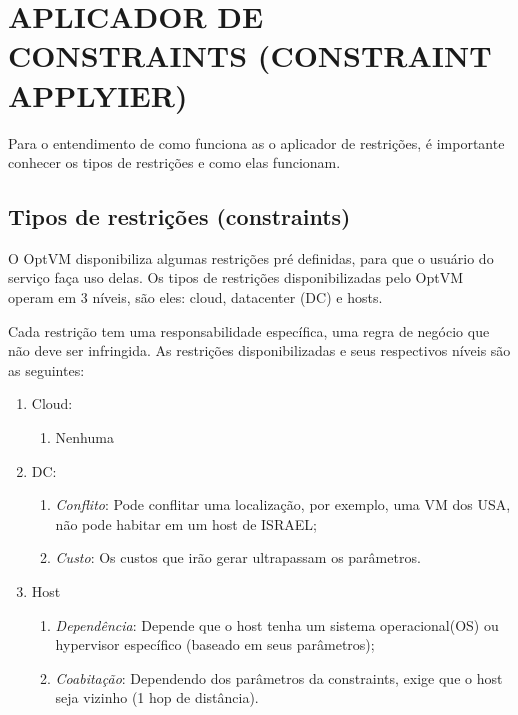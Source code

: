 \section{APLICADOR DE CONSTRAINTS (CONSTRAINT APPLYIER)}

Para o entendimento de como funciona as o aplicador de restrições, é importante conhecer os tipos
de restrições e como elas funcionam.

\subsection{Tipos de restrições (constraints)}

O OptVM disponibiliza algumas restrições pré definidas, para que o usuário do serviço faça uso delas.
Os tipos de restrições disponibilizadas pelo OptVM operam em 3 níveis, são eles: cloud, datacenter (DC)
e hosts.

Cada restrição tem uma responsabilidade específica, uma regra de negócio que não deve ser infringida. 
As restrições disponibilizadas e seus respectivos níveis são as seguintes:

\begin{enumerate}
  \item Cloud:
  \begin{enumerate}
    \item Nenhuma
  \end{enumerate}

  \item DC:
  \begin{enumerate}
    \item \textit{Conflito}: Pode conflitar uma localização, por exemplo, uma VM dos USA, não pode habitar em um host de ISRAEL;
    \item \textit{Custo}: Os custos que irão gerar ultrapassam os parâmetros.
  \end{enumerate}

 \item Host
  \begin{enumerate}
    \item \textit{Dependência}: Depende que o host tenha um sistema operacional(OS) ou hypervisor específico (baseado em seus parâmetros);
    \item \textit{Coabitação}: Dependendo dos parâmetros da constraints, exige que o host seja vizinho (1 hop de distância).
  \end{enumerate}
  
\end{enumerate}

